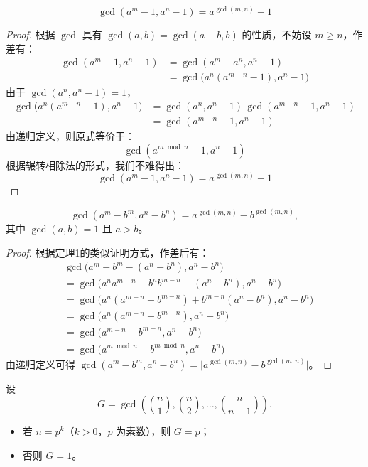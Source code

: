 \begin{theorem}
\[
\gcd(a^m - 1, a^n - 1) = a^{\gcd(m, n)} - 1
\]
\end{theorem}

\begin{proof}
根据 $\gcd$ 具有 $\gcd(a, b) = \gcd(a - b, b)$ 的性质，不妨设 $m \ge n$，作差有：
\[
\begin{aligned}
\gcd(a^m - 1, a^n - 1) &= \gcd(a^m - a^n, a^n - 1) \\
&= \gcd\bigl(a^n(a^{m - n} - 1), a^n - 1\bigr)
\end{aligned}
\]
由于 $\gcd(a^n, a^n - 1) = 1$，
\[
\begin{aligned}
\gcd\bigl(a^n(a^{m - n} - 1), a^n - 1\bigr)
&= \gcd(a^n, a^n - 1)\,\gcd(a^{m - n} - 1, a^n - 1) \\
&= \gcd(a^{m - n} - 1, a^n - 1)
\end{aligned}
\]
由递归定义，则原式等价于：
\[
\gcd(a^{m \bmod n} - 1, a^n - 1)
\]
根据辗转相除法的形式，我们不难得出：
\[
\gcd(a^m - 1, a^n - 1) = a^{\gcd(m, n)} - 1
\]
\end{proof}

\begin{theorem}
\[
\gcd(a^m - b^m, a^n - b^n) = a^{\gcd(m, n)} - b^{\gcd(m, n)},
\]
其中 $\gcd(a, b) = 1$ 且 $a > b$。
\end{theorem}

\begin{proof}
根据定理1的类似证明方式，作差后有：
\[
\begin{aligned}
&\gcd\bigl(a^m - b^m - (a^n - b^n), a^n - b^n\bigr) \\
&= \gcd\bigl(a^n a^{m-n} - b^n b^{m-n} - (a^n - b^n), a^n - b^n\bigr) \\
&= \gcd\bigl(a^n(a^{m-n} - b^{m-n}) + b^{m-n}(a^n - b^n), a^n - b^n\bigr) \\
&= \gcd\bigl(a^n(a^{m-n} - b^{m-n}), a^n - b^n\bigr) \\
&= \gcd\bigl(a^{m-n} - b^{m-n}, a^n - b^n\bigr) \\
&= \gcd\bigl(a^{m \bmod n} - b^{m \bmod n}, a^n - b^n\bigr)
\end{aligned}
\]
由递归定义可得 $\gcd(a^m - b^m, a^n - b^n) = \bigl| a^{\gcd(m, n)} - b^{\gcd(m, n)} \bigr|$。
\end{proof}

\begin{theorem}
设
\[
G = \gcd\left(\binom{n}{1}, \binom{n}{2}, \ldots, \binom{n}{n-1}\right).
\]
\begin{itemize}
\item 若 $n = p^k$（$k>0$，$p$ 为素数），则 $G = p$；
\item 否则 $G = 1$。
\end{itemize}
\end{theorem}

